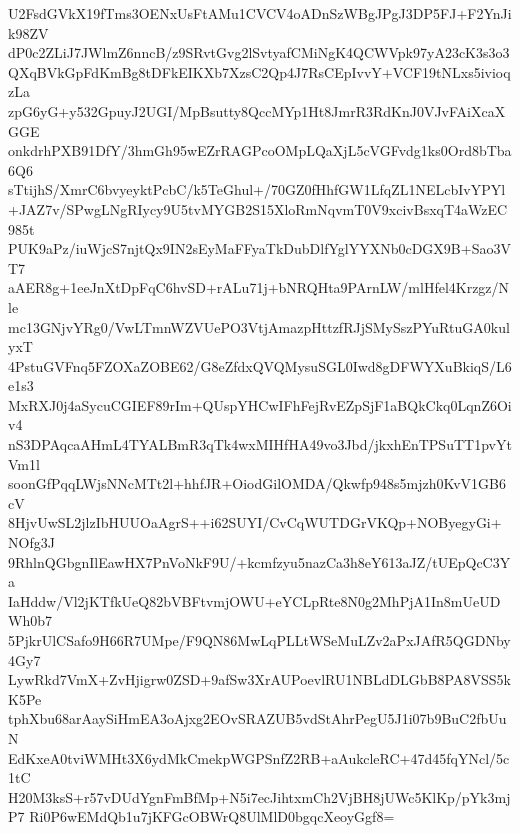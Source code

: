 U2FsdGVkX19fTms3OENxUsFtAMu1CVCV4oADnSzWBgJPgJ3DP5FJ+F2YnJik98ZV
dP0c2ZLiJ7JWlmZ6nncB/z9SRvtGvg2lSvtyafCMiNgK4QCWVpk97yA23cK3s3o3
QXqBVkGpFdKmBg8tDFkEIKXb7XzsC2Qp4J7RsCEpIvvY+VCF19tNLxs5ivioqzLa
zpG6yG+y532GpuyJ2UGI/MpBsutty8QccMYp1Ht8JmrR3RdKnJ0VJvFAiXcaXGGE
onkdrhPXB91DfY/3hmGh95wEZrRAGPcoOMpLQaXjL5cVGFvdg1ks0Ord8bTba6Q6
sTtijhS/XmrC6bvyeyktPcbC/k5TeGhul+/70GZ0fHhfGW1LfqZL1NELcbIvYPYl
+JAZ7v/SPwgLNgRIycy9U5tvMYGB2S15XloRmNqvmT0V9xcivBsxqT4aWzEC985t
PUK9aPz/iuWjcS7njtQx9IN2sEyMaFFyaTkDubDlfYglYYXNb0cDGX9B+Sao3VT7
aAER8g+1eeJnXtDpFqC6hvSD+rALu71j+bNRQHta9PArnLW/mlHfel4Krzgz/Nle
mc13GNjvYRg0/VwLTmnWZVUePO3VtjAmazpHttzfRJjSMySszPYuRtuGA0kulyxT
4PstuGVFnq5FZOXaZOBE62/G8eZfdxQVQMysuSGL0Iwd8gDFWYXuBkiqS/L6e1s3
MxRXJ0j4aSycuCGIEF89rIm+QUspYHCwIFhFejRvEZpSjF1aBQkCkq0LqnZ6Oiv4
nS3DPAqcaAHmL4TYALBmR3qTk4wxMIHfHA49vo3Jbd/jkxhEnTPSuTT1pvYtVm1l
soonGfPqqLWjsNNcMTt2l+hhfJR+OiodGilOMDA/Qkwfp948s5mjzh0KvV1GB6cV
8HjvUwSL2jlzIbHUUOaAgrS++i62SUYI/CvCqWUTDGrVKQp+NOByegyGi+NOfg3J
9RhlnQGbgnIlEawHX7PnVoNkF9U/+kcmfzyu5nazCa3h8eY613aJZ/tUEpQcC3Ya
IaHddw/Vl2jKTfkUeQ82bVBFtvmjOWU+eYCLpRte8N0g2MhPjA1In8mUeUDWh0b7
5PjkrUlCSafo9H66R7UMpe/F9QN86MwLqPLLtWSeMuLZv2aPxJAfR5QGDNby4Gy7
LywRkd7VmX+ZvHjigrw0ZSD+9afSw3XrAUPoevlRU1NBLdDLGbB8PA8VSS5kK5Pe
tphXbu68arAaySiHmEA3oAjxg2EOvSRAZUB5vdStAhrPegU5J1i07b9BuC2fbUuN
EdKxeA0tviWMHt3X6ydMkCmekpWGPSnfZ2RB+aAukcleRC+47d45fqYNcl/5c1tC
H20M3ksS+r57vDUdYgnFmBfMp+N5i7ecJihtxmCh2VjBH8jUWc5KlKp/pYk3mjP7
Ri0P6wEMdQb1u7jKFGcOBWrQ8UlMlD0bgqcXeoyGgf8=

